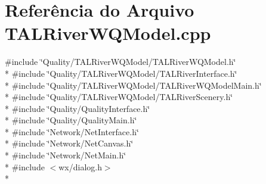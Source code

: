 \section{Referência do Arquivo T\+A\+L\+River\+W\+Q\+Model.\+cpp}
\label{_t_a_l_river_w_q_model_8cpp}
{\ttfamily \#include \char`\"{}Quality/\+T\+A\+L\+River\+W\+Q\+Model/\+T\+A\+L\+River\+W\+Q\+Model.\+h\char`\"{}}\\*
{\ttfamily \#include \char`\"{}Quality/\+T\+A\+L\+River\+W\+Q\+Model/\+T\+A\+L\+River\+Interface.\+h\char`\"{}}\\*
{\ttfamily \#include \char`\"{}Quality/\+T\+A\+L\+River\+W\+Q\+Model/\+T\+A\+L\+River\+W\+Q\+Model\+Main.\+h\char`\"{}}\\*
{\ttfamily \#include \char`\"{}Quality/\+T\+A\+L\+River\+W\+Q\+Model/\+T\+A\+L\+River\+Scenery.\+h\char`\"{}}\\*
{\ttfamily \#include \char`\"{}Quality/\+Quality\+Interface.\+h\char`\"{}}\\*
{\ttfamily \#include \char`\"{}Quality/\+Quality\+Main.\+h\char`\"{}}\\*
{\ttfamily \#include \char`\"{}Network/\+Net\+Interface.\+h\char`\"{}}\\*
{\ttfamily \#include \char`\"{}Network/\+Net\+Canvas.\+h\char`\"{}}\\*
{\ttfamily \#include \char`\"{}Network/\+Net\+Main.\+h\char`\"{}}\\*
{\ttfamily \#include $<$wx/dialog.\+h$>$}\\*
